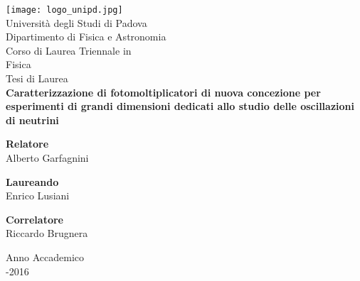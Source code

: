 \begin{titlepage}
  \vspace{-2cm}
  \begin{center}
    \texttt{[image: logo\_unipd.jpg]}\vspace{1cm}
    \\
    \textmd{
      \fontsize{18pt}{20pt}\selectfont Università degli Studi di Padova
      \vspace{5pt} \\
      \fontsize{14pt}{20pt}\selectfont Dipartimento di Fisica e Astronomia 
      \vspace{15pt} \\
      \fontsize{14pt}{20pt}\selectfont Corso di Laurea Triennale in \\ 
      \fontsize{14pt}{20pt}\selectfont Fisica 
      \vspace{10pt} \\
    }
    \fontsize{9pt}{20pt}\selectfont Tesi di Laurea 
    \vspace{10pt} \\
    
    \textbf{
      \fontsize{14pt}{20pt}\selectfont Caratterizzazione di fotomoltiplicatori di nuova concezione per esperimenti di grandi dimensioni dedicati allo studio delle oscillazioni di neutrini \\
    }
  \end{center}
  
  \vspace{60pt}
  
  \begin{flushleft}
    \fontsize{10pt}{10pt}\selectfont \textbf{Relatore} \\
    \fontsize{10pt}{10pt}\selectfont Alberto Garfagnini \\
  \end{flushleft}
  \begin{flushright}
    \fontsize{10pt}{10pt}\selectfont \textbf{Laureando} \\
    \fontsize{10pt}{10pt}\selectfont Enrico Lusiani \\
  \end{flushright}
  \begin{flushleft}
    \fontsize{10pt}{10pt}\selectfont \textbf{Correlatore} \\
    \fontsize{10pt}{10pt}\selectfont Riccardo Brugnera \\
  \end{flushleft}	
 
  \begin{center}
    \vfill
    \fontsize{11pt}{10pt}\selectfont Anno Accademico \\
    \fontsize{11pt}{10pt}-2016 \\
  \end{center}
\end{titlepage}

